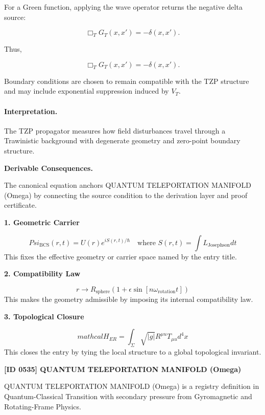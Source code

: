 For a Green function, applying the wave operator returns the negative delta source:

\begin{equation}
\Box_T G_T(x,x')
=
-\delta(x,x') .
\end{equation}

Thus,

\begin{equation}
\boxed{
\Box_T G_T(x,x')
=
-\delta(x,x') .
}
\end{equation}

Boundary conditions are chosen to remain compatible with the TZP structure and may include exponential suppression induced by $V_T$.

\paragraph{Interpretation.}
The TZP propagator measures how field disturbances travel through a Trawinistic background with degenerate geometry and zero-point boundary structure.

\par\vspace{0.35em}
\noindent\textbf{Derivable Consequences.}\quad
\begingroup
\footnotesize
\raggedright
The canonical equation anchors QUANTUM TELEPORTATION MANIFOLD (Omega) by connecting the source condition to the derivation layer and proof certificate.
\par\endgroup

\noindent\textbf{1. Geometric Carrier}\par
\[
Psi_{\text{BCS}}(r,t) = U(r)e^{iS(r,t)/\hbar} \quad \text{where } S(r,t) = \int L_{\text{Josephson}} dt
\]
\noindent This fixes the effective geometry or carrier space named by the entry title.\par
\noindent\textbf{2. Compatibility Law}\par
\[
r \to R_{\text{sphere}} (1 + \epsilon \sin[n \omega_{\text{rotation}} t])
\]
\noindent This makes the geometry admissible by imposing its internal compatibility law.\par
\noindent\textbf{3. Topological Closure}\par
\[
mathcal{H}_{ER} = \int_{\Sigma} \sqrt{|g|} R^{\mu u} T_{\mu u} d^4x
\]
\noindent This closes the entry by tying the local structure to a global topological invariant.\par

\clearpage
\noindent\textbf{[ID 0535] QUANTUM TELEPORTATION MANIFOLD (Omega)}\par
\vspace{0.35em}
\begingroup\small
{}
QUANTUM TELEPORTATION MANIFOLD (Omega) is a registry definition in Quantum-Classical Transition with secondary pressure from Gyromagnetic and Rotating-Frame Physics.

